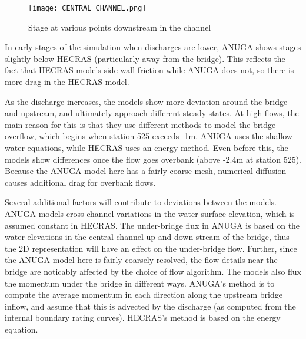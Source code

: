 \begin{figure}
\begin{center}
\texttt{[image: CENTRAL\_CHANNEL.png]}
\end{center}
\caption{Stage at various points downstream in the channel}
\label{Reach}
\end{figure}

In early stages of the simulation when discharges are lower, ANUGA shows stages
slightly below HECRAS (particularly away from the bridge). This reflects the
fact that HECRAS models side-wall friction while ANUGA does not, so there is
more drag in the HECRAS model. 

As the discharge increases, the models show more deviation around the bridge
and upstream, and ultimately approach different steady states. At high flows,
the main reason for this is that they use different methods to model the bridge
overflow, which begins when station 525 exceeds -1m. ANUGA uses the shallow
water equations, while HECRAS uses an energy method. Even before this, the
models show differences once the flow goes overbank (above -2.4m at station
525). Because the ANUGA model here has a fairly coarse mesh, numerical
diffusion causes additional drag for overbank flows. 

Several additional factors will contribute to deviations between the models.
ANUGA models cross-channel variations in the water surface elevation, which is
assumed constant in HECRAS. The under-bridge flux in ANUGA is based on the
water elevations in the central channel up-and-down stream of the bridge, thus
the 2D representation will have an effect on the under-bridge flow. Further,
since the ANUGA model here is fairly coarsely resolved, the flow details near
the bridge are noticably affected by the choice of flow algorithm. The models
also flux the momentum under the bridge in different ways. ANUGA's method is to
compute the average momentum in each direction along the upstream bridge
inflow, and assume that this is advected by the discharge (as computed from the
internal boundary rating curves). HECRAS's method is based on the energy
equation. 



